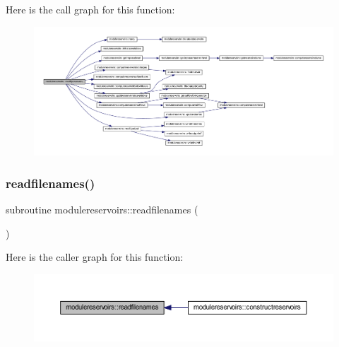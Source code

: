 Here is the call graph for this function\+:\nopagebreak
\begin{figure}[H]
\begin{center}
\leavevmode
\includegraphics[width=350pt]{namespacemodulereservoirs_a65da9561acff8444f90db1ccde975201_cgraph}
\end{center}
\end{figure}
\mbox{\label{namespacemodulereservoirs_a9ca6b6f1b29d44a299bd0cd902b875bd}} 
\subsubsection{\texorpdfstring{readfilenames()}{readfilenames()}}
{\footnotesize\ttfamily subroutine modulereservoirs\+::readfilenames (\begin{DoxyParamCaption}{ }\end{DoxyParamCaption})\hspace{0.3cm}{\ttfamily [private]}}

Here is the caller graph for this function\+:\nopagebreak
\begin{figure}[H]
\begin{center}
\leavevmode
\includegraphics[width=350pt]{namespacemodulereservoirs_a9ca6b6f1b29d44a299bd0cd902b875bd_icgraph}
\end{center}
\end{figure}
\mbox{\label{namespacemodulereservoirs_a211f03dad795e61e39d0f58b7002bb26}} 
